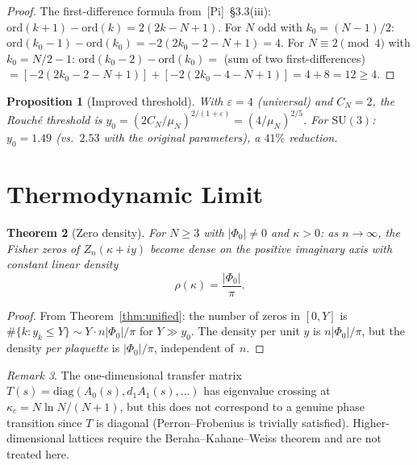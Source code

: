 \documentclass[12pt]{article}
\newtheorem{theorem}{Theorem}
\newtheorem{proposition}[theorem]{Proposition}
\theoremstyle{remark}
\newtheorem{remark}[theorem]{Remark}
\newcommand{\SU}{\mathrm{SU}}
\newcommand{\ord}{\mathrm{ord}}
\begin{document}
\begin{proof}
The first-difference formula from~[Pi]~\S3.3(iii):
$\ord(k+1) - \ord(k) = 2(2k - N + 1)$.
For $N$ odd with $k_0 = (N-1)/2$:
$\ord(k_0 - 1) - \ord(k_0) = -2(2k_0 - 2 - N + 1) = 4$.
For $N \equiv 2 \pmod{4}$ with $k_0 = N/2 - 1$:
$\ord(k_0 - 2) - \ord(k_0) = $ (sum of two first-differences)
$= [-2(2k_0-2-N+1)] + [-2(2k_0-4-N+1)] = 4 + 8 = 12 \geq 4$.
\end{proof}

\begin{proposition}[Improved threshold]\label{prop:rouche}
With $\varepsilon = 4$ (universal) and $C_N = 2$, the Rouch\'e threshold is
$y_0 = (2C_N/\mu_N)^{2/(1+\varepsilon)} = (4/\mu_N)^{2/5}$.
For $\SU(3)$: $y_0 = 1.49$ (vs.\ $2.53$ with the original parameters),
a $41\%$ reduction.
\end{proposition}


\section{Thermodynamic Limit}\label{sec:thermo}

\begin{theorem}[Zero density]\label{thm:density}
For $N \geq 3$ with $|\Phi_0| \neq 0$ and $\kappa > 0$:
as $n \to \infty$, the Fisher zeros of $Z_n(\kappa + iy)$ become
dense on the positive imaginary axis with constant linear density
\begin{equation}
  \rho(\kappa) = \frac{|\Phi_0|}{\pi}.
\end{equation}
\end{theorem}

\begin{proof}
From Theorem~\ref{thm:unified}: the number of zeros in $[0, Y]$ is
$\#\{k : y_k \leq Y\} \sim Y \cdot n|\Phi_0|/\pi$ for $Y \gg y_0$.
The density per unit $y$ is $n|\Phi_0|/\pi$, but the density
\emph{per plaquette} is $|\Phi_0|/\pi$, independent of~$n$.
\end{proof}

\begin{remark}
The one-dimensional transfer matrix $T(s) = \mathrm{diag}(A_0(s), d_1 A_1(s), \ldots)$
has eigenvalue crossing at $\kappa_c = N \ln N / (N + 1)$, but this does
not correspond to a genuine phase transition since $T$ is diagonal
(Perron--Frobenius is trivially satisfied). Higher-dimensional lattices
require the Beraha--Kahane--Weiss theorem and are not treated here.
\end{remark}
\end{document}
